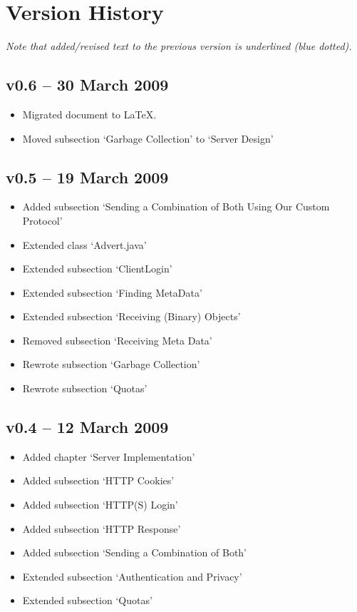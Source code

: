 \section{Version History}
\emph{Note that added/revised text to the previous version is underlined (blue
dotted).}

\subsection*{v0.6 -- 30 March 2009}
\begin{itemize}
\item Migrated document to \LaTeX.
\item Moved subsection `Garbage Collection' to `Server Design'
\end{itemize}

\subsection*{v0.5 -- 19 March 2009}
\begin{itemize}
\item Added subsection `Sending a Combination of Both Using Our Custom Protocol'
\item Extended class `Advert.java'
\item Extended subsection `ClientLogin'
\item Extended subsection `Finding MetaData'
\item Extended subsection `Receiving (Binary) Objects'
\item Removed subsection `Receiving Meta Data'
\item Rewrote subsection `Garbage Collection'
\item Rewrote subsection `Quotas'
\end{itemize}

\subsection*{v0.4 -- 12 March 2009}
\begin{itemize}
\item Added chapter `Server Implementation'
\item Added subsection `HTTP Cookies'
\item Added subsection `HTTP(S) Login'
\item Added subsection `HTTP Response'
\item Added subsection `Sending a Combination of Both'
\item Extended subsection `Authentication and Privacy'
\item Extended subsection `Quotas'
\end{itemize}

